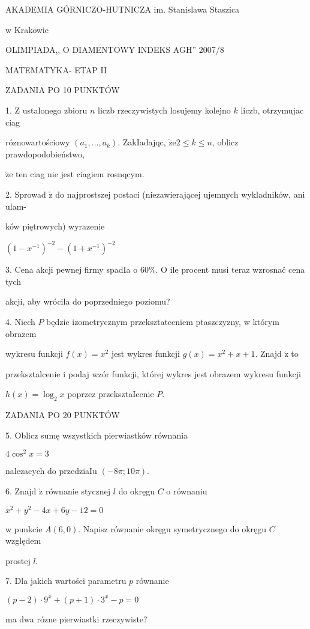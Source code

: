 \documentclass[a4paper,12pt]{article}
\begin{document}
AKADEMIA GÓRNICZO-HUTNICZA im. Stanislawa Staszica

w Krakowie

OLIMPIADA,, O DIAMENTOWY INDEKS AGH'' 2007/8

MATEMATYKA- ETAP II

ZADANIA PO 10 PUNKTÓW

1. $\mathrm{Z}$ ustalonego zbioru $n$ liczb rzeczywistych losujemy kolejno $k$ liczb, otrzymujac ciag

róznowartościowy $(a_{1},\ldots,a_{k})$. ZakIadajqc, $\dot{\mathrm{z}}\mathrm{e}2\leq k\leq n$, oblicz prawdopodobieństwo,

$\dot{\mathrm{z}}\mathrm{e}$ ten ciag nie jest ciagiem rosnqcym.

2. Sprowad $\acute{\mathrm{z}}$ do najprostszej postaci (niezawierającej ujemnych wykladników, ani ulam-

ków piętrowych) wyrazenie

$(1-x^{-1})^{-2}-(1+x^{-1})^{-2}$

3. Cena akcji pewnej firmy spadIa o 60\%. $\mathrm{O}$ ile procent musi teraz wzrosnač cena tych

akcji, aby wrócila do poprzedniego poziomu?

4. Niech $P$ będzie izometrycznym przeksztatceniem ptaszczyzny, w którym obrazem

wykresu funkcji $f(x) = x^{2}$ jest wykres funkcji $g(x) = x^{2}+x+1.$ Znajd $\acute{\mathrm{z}}$ to

przeksztalcenie i podaj wzór funkcji, której wykres jest obrazem wykresu funkcji

$h(x)=\log_{2}x$ poprzez przeksztaIcenie $P.$

ZADANIA PO 20 PUNKTÓW

5. Oblicz sumę wszystkich pierwiastków równania

$4\cos^{2}x=3$

nalezacych do przedziaIu $(-8\pi;10\pi).$

6. Znajd $\acute{\mathrm{z}}$ równanie stycznej $l$ do okręgu $C$ o równaniu

$x^{2}+y^{2}-4x+6y-12=0$

w punkcie $A(6,0)$. Napisz równanie okręgu symetrycznego do okręgu $C$ względem

prostej $l.$

7. Dla jakich wartości parametru $p$ równanie

$(p-2)\cdot 9^{x}+(p+1)\cdot 3^{x}-p=0$

ma dwa rózne pierwiastki rzeczywiste?
\end{document}
